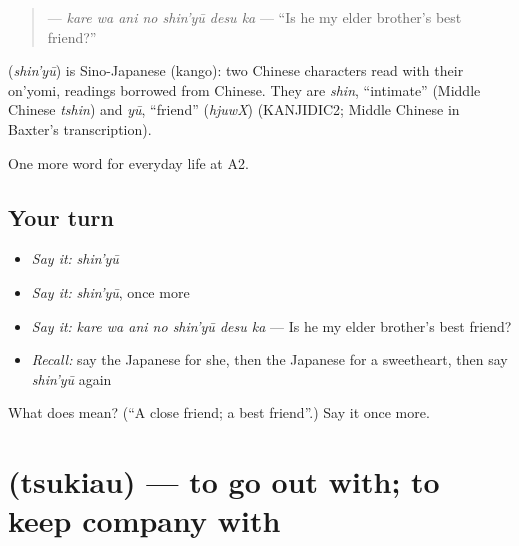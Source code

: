 \begin{quote}
\textbf{  } — \emph{kare wa ani no shin'yū desu ka} — \textquotedblleft{}Is he my elder brother's best friend?\textquotedblright{}
\end{quote}

\begin{cousinweb}
\textbf{} (\emph{shin'yū}) is Sino-Japanese (kango): two Chinese characters read with their on'yomi, readings borrowed from Chinese. They are \emph{shin}, \textquotedblleft{}intimate\textquotedblright{} (Middle Chinese \emph{tshin}) and \emph{yū}, \textquotedblleft{}friend\textquotedblright{} (\emph{hjuwX}) (KANJIDIC2; Middle Chinese in Baxter's transcription).
\end{cousinweb}

\begin{grammarlens}[title={What you've built}]
One more word for everyday life at A2.
\end{grammarlens}

\subsection*{Your turn}
\begin{itemize}
\raggedright
  \item \emph{Say it:} \emph{shin'yū}
  \item \emph{Say it:} \emph{shin'yū}, once more
  \item \emph{Say it:} \emph{kare wa ani no shin'yū desu ka} — Is he my elder brother's best friend?
  \item \emph{Recall:} say the Japanese for she, then the Japanese for a sweetheart, then say \emph{shin'yū} again
\end{itemize}

\begin{tcolorbox}[breakable,colback=teal!4,colframe=teal!35!black,title={Before you move on}]
What does  mean? (\textquotedblleft{}A close friend; a best friend\textquotedblright{}.) Say it once more.
\end{tcolorbox}
\section[\texorpdfstring{\ja{つきあう} (tsukiau)}{つきあう (tsukiau)}]{ (tsukiau) — to go out with; to keep company with}

\label{lesson:JA-C242-tsukiau}



